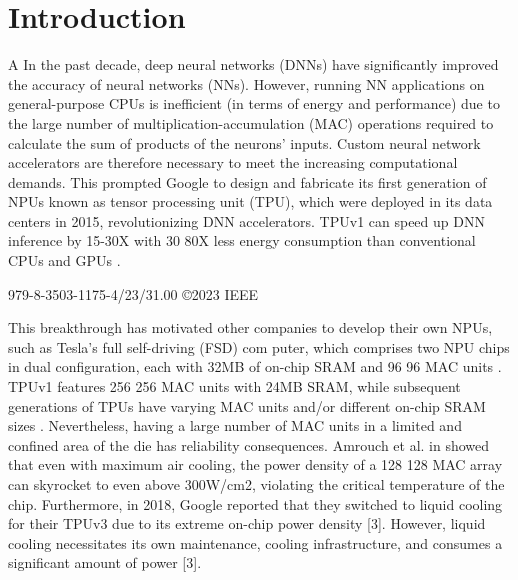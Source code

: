 \documentclass[sigconf]{acmart}
\begin{document}
\maketitle

\section{Introduction}
A In the past decade, deep neural networks (DNNs) have significantly improved the accuracy of neural networks (NNs). However, running NN applications on general-purpose CPUs is inefficient (in terms of energy and performance) due to the large number of multiplication-accumulation (MAC) operations required to calculate the sum of products of the neurons’ inputs. Custom neural network accelerators are therefore necessary to meet the increasing computational demands. This prompted Google to design and fabricate its first generation of NPUs known as tensor processing unit (TPU), which were deployed in its data centers in 2015, revolutionizing DNN accelerators. TPUv1 can speed up DNN inference by 15-30X with 30 80X less energy consumption than conventional CPUs and GPUs \cite{ref1}.
 
 \begin{center}
     {979-8-3503-1175-4/23/31.00 ©2023 IEEE}
 \end{center}
 
 This breakthrough has motivated other companies to develop their own NPUs, such as Tesla’s full self-driving (FSD) com puter, which comprises two NPU chips in dual configuration, each with 32MB of on-chip SRAM and 96 96 MAC units \cite{ref2}. TPUv1 features 256 256 MAC units with 24MB SRAM, while subsequent generations of TPUs have varying MAC units and/or different on-chip SRAM sizes \cite{ref3}. Nevertheless, having a large number of MAC units in a limited and confined area of the die has reliability consequences. Amrouch et al. in \cite{ref4} showed that even with maximum air cooling, the power density of a 128 128 MAC array can skyrocket to even above 300W/cm2, violating the critical temperature of the chip. Furthermore, in 2018, Google reported that they switched to liquid cooling for their TPUv3 due to its extreme on-chip power density [3]. However, liquid cooling necessitates its own maintenance, cooling infrastructure, and consumes a significant amount of power [3]. 
 
\end{document}
